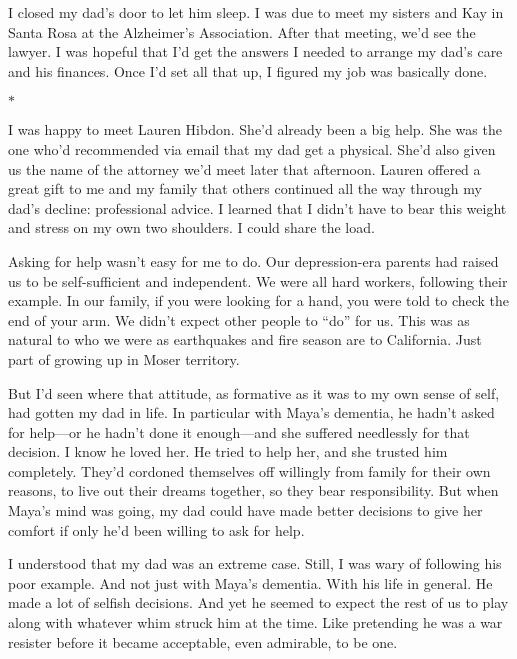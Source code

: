 \documentclass[12pt]{book}
\begin{document}
I closed my dad's door to let him sleep. I was due to meet my sisters and Kay in Santa Rosa at the Alzheimer's Association. After that meeting, we'd see the lawyer. I was hopeful that I'd get the answers I needed to arrange my dad's care and his finances. Once I'd set all that up, I figured my job was basically done.

\begin{center}$*$\end{center}

I was happy to meet Lauren Hibdon. She'd already been a big help. She was the one who'd recommended via email that my dad get a physical. She'd also given us the name of the attorney we'd meet later that afternoon. Lauren offered a great gift to me and my family that others continued all the way through my dad's decline: professional advice. I learned that I didn't have to bear this weight and stress on my own two shoulders. I could share the load.

Asking for help wasn't easy for me to do. Our depression-era parents had raised us to be self-sufficient and independent. We were all hard workers, following their example. In our family, if you were looking for a hand, you were told to check the end of your arm. We didn't expect other people to ``do'' for us. This was as natural to who we were as earthquakes and fire season are to California. Just part of growing up in Moser territory.

But I'd seen where that attitude, as formative as it was to my own sense of self, had gotten my dad in life. In particular with Maya's dementia, he hadn't asked for help---or he hadn't done it enough---and she suffered needlessly for that decision. I know he loved her. He tried to help her, and she trusted him completely. They'd cordoned themselves off willingly from family for their own reasons, to live out their dreams together, so they bear responsibility. But when Maya's mind was going, my dad could have made better decisions to give her comfort if only he'd been willing to ask for help.

I understood that my dad was an extreme case. Still, I was wary of following his poor example. And not just with Maya's dementia. With his life in general. He made a lot of selfish decisions. And yet he seemed to expect the rest of us to play along with whatever whim struck him at the time. Like pretending he was a war resister before it became acceptable, even admirable, to be one.
\end{document}
